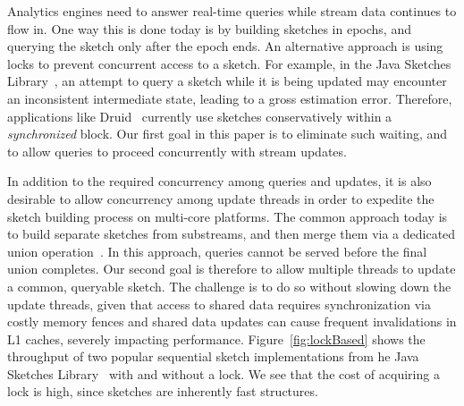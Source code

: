  Analytics engines need to answer real-time queries while  stream data continues to flow in.
 One way this is done 
today is by building sketches in epochs, and querying the sketch only after
 the epoch ends. An alternative approach is using locks to prevent concurrent access to a sketch.
 For example, in the Java Sketches Library~\cite{sketchesLibrary},  an 
attempt to query a sketch  while it is being updated  may encounter an inconsistent
intermediate state, leading to a gross estimation error. Therefore, applications like Druid~\cite{druid}
currently use sketches conservatively within a \emph{synchronized} block.
Our first goal in this paper is to eliminate such waiting, and to allow queries to proceed 
concurrently with stream updates. 

In addition to the required concurrency among queries and updates,
it is also desirable to allow
concurrency among update threads in order to expedite the sketch building process on multi-core platforms. 
The common approach today is to build separate sketches from substreams, 
and then merge them via a dedicated union operation~\cite{multi-KMV}. 
In this approach, queries cannot be served before the final union completes. 
Our second goal is therefore to allow multiple threads to update a common, 
queryable sketch. The challenge is to do so without slowing down the update threads,
given that access to shared data requires  synchronization via costly memory fences 
and shared data updates can cause frequent invalidations in L1 caches, severely impacting performance. 
Figure~\ref{fig:lockBased} shows the throughput of two  popular
sequential sketch implementations from he Java Sketches Library~\cite{sketchesLibrary} with
and without a lock. We see that 
the cost of acquiring a lock  is  high, since  sketches are
inherently fast structures.

